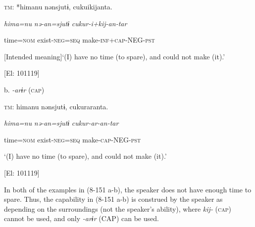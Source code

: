   \textsc{tm}:  *himanu  nənsjutɨ,  cukuikijanta.

    \textit{hima=nu}  \textit{nə-an=sjutɨ}  \textit{cukur-i+kij{}-an-tar}

    time=\textsc{nom}  exist-\textsc{neg}=\textsc{seq}  make-\textsc{inf}+\textsc{cap}-NEG-\textsc{pst}

    [Intended meaning]‘(I) have no time (to spare), and could not make (it).’

    [El: 101119]

  b. \textit{{}-arɨr} (\textsc{cap})

  \textsc{tm}:  himanu  nənsjutɨ,  cukuraranta.

    \textit{hima=nu}  \textit{nə-an=sjutɨ}  \textit{cukur-ar{}-an-tar}

    time=\textsc{nom}  exist-\textsc{neg}=\textsc{seq}  make-\textsc{cap}-NEG-\textsc{pst}

    ‘(I) have no time (to spare), and could not make (it).’

    [El: 101119]

In both of the examples in (8-151 a-b), the speaker does not have enough time to spare. Thus, the capability in (8-151 a-b) is construed by the speaker as depending on the surroundings (not the speaker’s ability), where \textit{kij-} (\textsc{cap}) cannot be used, and only \textit{{}-arɨr} (CAP) can be used.
